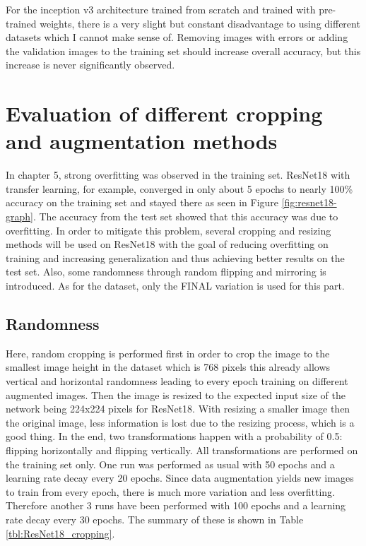 For the inception v3 architecture trained from scratch and trained with pre-trained weights, there is a very slight but constant disadvantage to using different datasets which I cannot make sense of. Removing images with errors or adding the validation images to the training set should increase overall accuracy, but this increase is never significantly observed.












\section{Evaluation of different cropping and augmentation methods}

In chapter 5, strong overfitting was observed in the training set. ResNet18 with transfer learning, for example, converged in only about 5 epochs to nearly 100\% accuracy on the training set and stayed there as seen in Figure \ref{fig:resnet18-graph}. The accuracy from the test set showed that this accuracy was due to overfitting. In order to mitigate this problem, several cropping and resizing methods will be used on ResNet18 with the goal of reducing overfitting on training and increasing generalization and thus achieving better results on the test set. Also, some randomness through random flipping and mirroring is introduced. As for the dataset, only the FINAL variation is used for this part.

\subsection{Randomness}

Here, random cropping is performed first in order to crop the image to the smallest image height in the dataset which is 768 pixels this already allows vertical and horizontal randomness leading to every epoch training on different augmented images. Then the image is resized to the expected input size of the network being 224x224 pixels for ResNet18. With resizing a  smaller image then the original image, less information is lost due to the resizing process, which is a good thing. In the end, two transformations happen with a probability of 0.5: flipping horizontally and flipping vertically. All transformations are performed on the training set only. One run was performed as usual with 50 epochs and a  learning rate decay every 20 epochs. Since data augmentation yields new images to train from every epoch, there is much more variation and less overfitting. Therefore another 3 runs have been performed with 100 epochs and a learning rate decay every  30 epochs. The summary of these is shown in Table \ref{tbl:ResNet18_cropping}. \\


